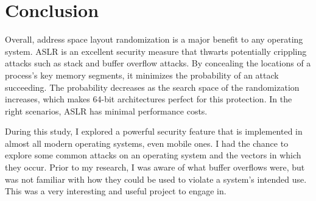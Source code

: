 \section{Conclusion}
\label{s:conclusion} %

Overall, address space layout randomization is a major benefit to any operating system. ASLR is an excellent security measure that thwarts potentially crippling attacks such as stack and buffer overflow attacks. By concealing the locations of a process’s key memory segments, it minimizes the probability of an attack succeeding. The probability decreases as the search space of the randomization increases, which makes 64-bit architectures perfect for this protection. In the right scenarios, ASLR has minimal performance costs.

During this study, I explored a powerful security feature that is implemented in almost all modern operating systems, even mobile ones. I had the chance to explore some common attacks on an operating system and the vectors in which they occur. Prior to my research, I was aware of what buffer overflows were, but was not familiar with how they could be used to violate a system’s intended use. This was a very interesting and useful project to engage in.

\lipsum[11-12]
